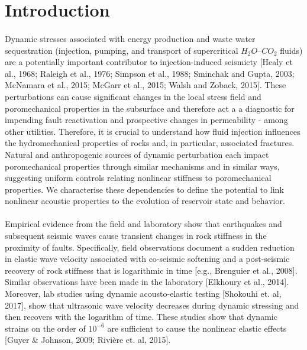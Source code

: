 \documentclass[letterpaper,10pt]{article}
\begin{document}
	
	
	
	\section{Introduction}
	\paragraph{} Dynamic stresses associated with energy production and waste water sequestration (injection, pumping, and transport of supercritical $H_{2}O$--$CO_{2}$ fluids) are a potentially important contributor to injection-induced seismicty [Healy et al., 1968; Raleigh et al., 1976; Simpson et al., 1988; Sminchak and Gupta, 2003; McNamara et al., 2015; McGarr et al., 2015; Walsh and Zoback, 2015]. These perturbations can cause significant changes in the local stress field and poromechanical properties in the subsurface and therefore act a a diagnostic for impending fault reactivation and prospective changes in permeability - among other utilities. Therefore, it is crucial to understand how fluid injection influences the hydromechanical properties of rocks and, in particular, associated fractures. Natural and anthropogenic sources of dynamic perturbation each impact poromechanical properties through similar mechanisms and in similar ways, suggesting uniform controls relating nonlinear stiffness to poromechanical properties. We characterise these dependencies to define the potential to link nonlinear acoustic properties to the evolution of reservoir state and behavior.
	
	\paragraph{}
	Empirical evidence from the field and laboratory show that earthquakes and subsequent seismic waves cause transient changes in rock stiffness in the proximity of faults. Specifically, field observations document a sudden reduction in elastic wave velocity associated with co-seismic softening and a post-seismic recovery of rock stiffness that is logarithmic in time [e.g., Brenguier et al., 2008]. Similar observations have been made in the laboratory [Elkhoury et al., 2014]. Moreover, lab studies using dynamic acousto-elastic testing [Shokouhi et. al, 2017], show that ultrasonic wave velocity decreases during dynamic stressing and then recovers with the logarithm of time. These studies show that dynamic strains on the order of $10^{-6}$ are sufficient to cause the nonlinear elastic effects [Guyer \& Johnson, 2009; Rivi\`ere et. al, 2015].
	
\end{document}
